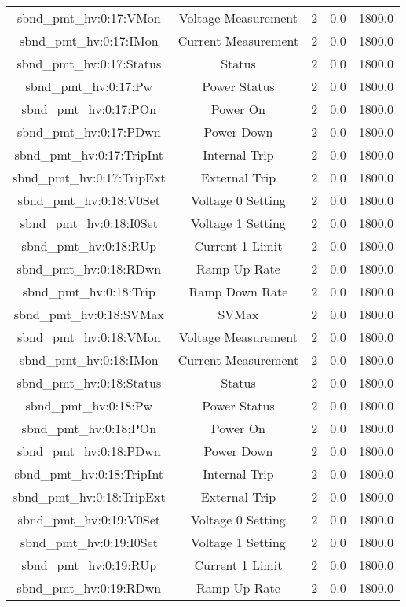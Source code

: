 \begin{center}
\begin{longtable}{c | c c c c }
sbnd\_pmt\_hv:0:17:VMon & Voltage Measurement & 2 & 0.0 & 1800.0\\ 
sbnd\_pmt\_hv:0:17:IMon & Current Measurement & 2 & 0.0 & 1800.0\\ 
sbnd\_pmt\_hv:0:17:Status & Status & 2 & 0.0 & 1800.0\\ 
sbnd\_pmt\_hv:0:17:Pw & Power Status & 2 & 0.0 & 1800.0\\ 
sbnd\_pmt\_hv:0:17:POn & Power On & 2 & 0.0 & 1800.0\\ 
sbnd\_pmt\_hv:0:17:PDwn & Power Down & 2 & 0.0 & 1800.0\\ 
sbnd\_pmt\_hv:0:17:TripInt & Internal Trip & 2 & 0.0 & 1800.0\\ 
sbnd\_pmt\_hv:0:17:TripExt & External Trip & 2 & 0.0 & 1800.0\\ 
sbnd\_pmt\_hv:0:18:V0Set & Voltage 0 Setting & 2 & 0.0 & 1800.0\\ 
sbnd\_pmt\_hv:0:18:I0Set & Voltage 1 Setting & 2 & 0.0 & 1800.0\\ 
sbnd\_pmt\_hv:0:18:RUp & Current 1 Limit & 2 & 0.0 & 1800.0\\ 
sbnd\_pmt\_hv:0:18:RDwn & Ramp Up Rate & 2 & 0.0 & 1800.0\\ 
sbnd\_pmt\_hv:0:18:Trip & Ramp Down Rate & 2 & 0.0 & 1800.0\\ 
sbnd\_pmt\_hv:0:18:SVMax & SVMax & 2 & 0.0 & 1800.0\\ 
sbnd\_pmt\_hv:0:18:VMon & Voltage Measurement & 2 & 0.0 & 1800.0\\ 
sbnd\_pmt\_hv:0:18:IMon & Current Measurement & 2 & 0.0 & 1800.0\\ 
sbnd\_pmt\_hv:0:18:Status & Status & 2 & 0.0 & 1800.0\\ 
sbnd\_pmt\_hv:0:18:Pw & Power Status & 2 & 0.0 & 1800.0\\ 
sbnd\_pmt\_hv:0:18:POn & Power On & 2 & 0.0 & 1800.0\\ 
sbnd\_pmt\_hv:0:18:PDwn & Power Down & 2 & 0.0 & 1800.0\\ 
sbnd\_pmt\_hv:0:18:TripInt & Internal Trip & 2 & 0.0 & 1800.0\\ 
sbnd\_pmt\_hv:0:18:TripExt & External Trip & 2 & 0.0 & 1800.0\\ 
sbnd\_pmt\_hv:0:19:V0Set & Voltage 0 Setting & 2 & 0.0 & 1800.0\\ 
sbnd\_pmt\_hv:0:19:I0Set & Voltage 1 Setting & 2 & 0.0 & 1800.0\\ 
sbnd\_pmt\_hv:0:19:RUp & Current 1 Limit & 2 & 0.0 & 1800.0\\ 
sbnd\_pmt\_hv:0:19:RDwn & Ramp Up Rate & 2 & 0.0 & 1800.0\\ 

\end{longtable}
\end{center}
